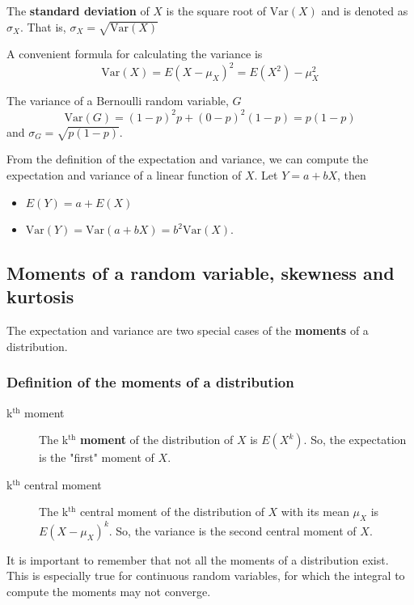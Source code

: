 \documentclass[a4paper,11pt]{article}
\begin{document}
The \textbf{standard deviation} of \(X\) is the square root of
\(\mathrm{Var}(X)\) and is denoted as \(\sigma_{X}\). That is,
\(\sigma_{X} = \sqrt{\mathrm{Var}(X)}\)

A convenient formula for calculating the variance is
\[ \mathrm{Var}(X) = E(X - \mu_X)^{2} = E(X^{2}) - \mu_X^{2} \]

The variance of a Bernoulli random variable, \(G\) 
\[ \mathrm{Var}(G) = (1-p)^{2}p + (0-p)^{2}(1-p) = p(1-p) \] and \(\sigma_{G} =
\sqrt{p(1-p)}\). 

From the definition of the expectation and variance, we can compute
the expectation and variance of a linear function of \(X\). Let \(Y = a +
bX\), then 
\begin{itemize}
\item \(E(Y) = a + E(X)\)
\item \(\mathrm{Var}(Y) = \mathrm{Var}(a + b X) = b^{2} \mathrm{Var}(X)\).
\end{itemize}


\subsection{Moments of a random variable, skewness and kurtosis}
\label{sec:org26b7320}

The expectation and variance are two special cases of the \textbf{moments} of
a distribution. 

\subsubsection*{Definition of the moments of a distribution}
\label{sec:org52c1323}

\begin{description}
\item[{k\(^{\text{th}}\) moment}] The k\(^{\text{th}}\) \textbf{moment} of the distribution of \(X\) is
\(E(X^{k})\). So, the expectation is the "first"
moment of \(X\).

\item[{k\(^{\text{th}}\) central moment}] The k\(^{\text{th}}\) central moment of the distribution
of \(X\) with its mean \(\mu_X\) is \(E(X - \mu_X)^{k}\). So, the
variance is the second central moment of \(X\).
\end{description}

It is important to remember that not all the moments of a distribution
exist. This is especially true for continuous random variables, for
which the integral to compute the moments may not converge. 
\end{document}
